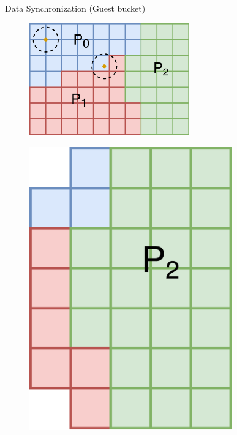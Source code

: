 \documentclass{beamer}
\begin{document}
\begin{frame}{Data Synchronization (Guest bucket)}
\begin{minipage}[b]{0.78\textwidth}
\begin{figure}
\flushright
\includegraphics[width=0.615\textwidth]{./PPT/Data_Syn}
\end{figure}
\end{minipage}
\begin{minipage}[b]{0.21\textwidth}
\begin{figure}
\flushright
\includegraphics[width=0.78\textwidth]{./PPT/Data_Syn_P2}
\end{figure}
\end{minipage}


\end{frame}
\end{document}

